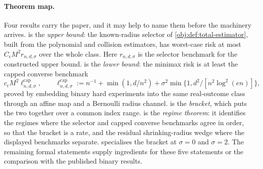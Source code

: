 \paragraph{Theorem map.} Four results carry the paper, and it may help to name them before the machinery arrives.  is the \emph{upper bound}: the known-radius selector of \cref{obj:def:total-estimator}, built from the polynomial and collision estimators, has worst-case risk at most \(C_\epsilon M^2r_{n,d,\sigma}\) over the whole class. Here \(r_{n,d,\sigma}\) is the selector benchmark for the constructed upper bound.  is the \emph{lower bound}: the minimax risk is at least the capped converse benchmark
\[
c_\epsilon M^2\ell^{\mathrm{cap}}_{n,d,\sigma},
\qquad
\ell^{\mathrm{cap}}_{n,d,\sigma}
:=
n^{-1}+\min(1,d/n^2)+\sigma^2\min\{1,d^2/[n^2\log^2(en)]\},
\]
proved by embedding binary hard experiments into the same real-outcome class through an affine map and a Bernoulli radius channel.  is the \emph{bracket}, which puts the two together over a common index range.  is the \emph{regime theorem}: it identifies the regimes where the selector and capped converse benchmarks agree in order, so that the bracket is a rate, and the residual shrinking-radius wedge where the displayed benchmarks separate.  specialises the bracket at \(\sigma=0\) and \(\sigma=2\). The remaining formal statements supply ingredients for these five statements or the comparison with the published binary results.
